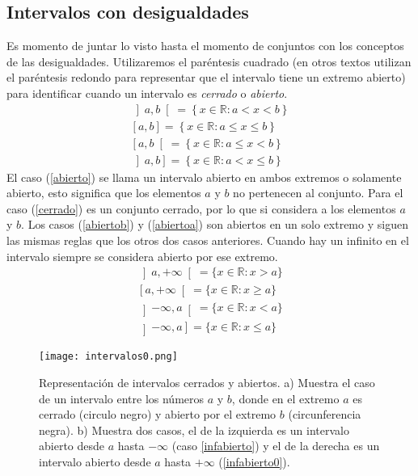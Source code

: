\subsection{Intervalos con desigualdades}
Es momento de juntar lo visto hasta el momento de conjuntos con los conceptos de las desigualdades. Utilizaremos el paréntesis cuadrado (en otros textos utilizan el paréntesis redondo para representar que el intervalo tiene un extremo abierto) para identificar cuando un intervalo es \textit{cerrado} o \textit{abierto}.\\
\begin{eqnarray}
\left] a,b\right[ =\left\{x\in\mathbb{R}:a<x<b\right\} \label{abierto}\\
\left[ a,b\right] = \left\{x\in\mathbb{R}:a\leq x\leq b\right\}\label{cerrado} \\
\left[a,b\right[=\left\{x\in\mathbb{R}:a\leq x< b\right\}\label{abiertob} \\
\left]a,b\right]=\left\{x\in\mathbb{R}:a< x\leq b\right\} \label{abiertoa}
\end{eqnarray}
El caso (\ref{abierto}) se llama un intervalo abierto en ambos extremos o solamente abierto, esto significa que los elementos $a$ y $b$ no pertenecen al conjunto. Para el caso (\ref{cerrado}) es un conjunto cerrado, por lo que si considera a los elementos $a$ y $b$. Los casos (\ref{abiertob}) y (\ref{abiertoa}) son abiertos en un solo extremo y siguen las mismas reglas que los otros dos casos anteriores. Cuando hay un infinito en el intervalo siempre se considera abierto por ese extremo.
\begin{eqnarray}
\left]a,+\infty\right[=\{x\in\mathbb{R}:x>a\}\label{infabierto0}\\
\left[a,+\infty\right[=\{x\in\mathbb{R}:x\geq a\}\\
\left]-\infty ,a\right[=\{x\in\mathbb{R}:x< a\}\label{infabierto}\\
\left]-\infty ,a\right]=\{x\in\mathbb{R}:x\leq a\} 
\end{eqnarray}



\begin{center}
	\begin{figure}[h!]
		\centering
		\texttt{[image: intervalos0.png]}
		\caption[Representación de intervalos cerrados y abiertos]{Representación de intervalos cerrados y abiertos. a) Muestra el caso de un intervalo entre los números $a$ y $b$, donde en el extremo $a$ es cerrado (circulo negro) y abierto por el extremo $b$ (circunferencia negra). b) Muestra dos casos, el de la izquierda es un intervalo abierto desde $a$ hasta $-\infty$ (caso \ref{infabierto}) y el de la derecha es un intervalo abierto desde $a$ hasta $+\infty$ (\ref{infabierto0}).}
		\label{interbalos0}
	\end{figure}
\end{center}

